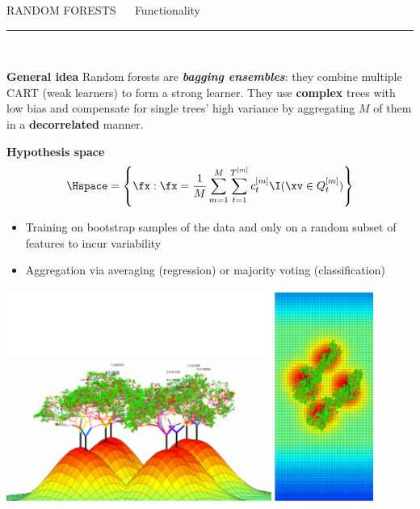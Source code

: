\documentclass[11pt,compress,t,notes=noshow, xcolor=table]{beamer}
\begin{document}
\LARGE
\begin{frame}{\textcolor{gray!80}{RANDOM FORESTS} ~~ Functionality}
\normalsize
\vspace{-0.5cm}
\noindent \textcolor{gray!80}{\rule{\textwidth}{1pt}}

\vspace{0.2cm}

\footnotesize

\colorbox{gray!80}{\textcolor{white}{SUPERVISED}} 
\colorbox{gray!80}{\textcolor{white}{NON-PARAMETRIC}} 
\colorbox{gray!80}{\textcolor{white}{BLACK-BOX}} 
\colorbox{gray!80}{\textcolor{white}{FEATURE SELECTION}}

\medskip

\textbf{\textcolor{gray!80}{General idea}} {}{} Random forests are 
\textit{\textbf{bagging ensembles}}: they combine multiple CART (weak learners)
to form a strong learner. They use \textbf{complex} trees with low  bias and 
compensate for single trees' high variance by aggregating $M$ of them in a 
\textbf{decorrelated} manner. 

\medskip

\textbf{\textcolor{gray!80}{Hypothesis space}}
$$\Hspace = \left\{ \fx: \fx = \frac{1}{M} \sum_{m = 1}^M \sum_{t = 1}^{T^{[m]}} 
c_t^{[m]} \I(\xv \in Q_t^{[m]}) \right\}$$

\medskip

\begin{minipage}{0.5\textwidth}
  \begin{itemize}
    \item Training on bootstrap samples of the data and only on a random subset 
    of features to incur variability
    \item Aggregation via averaging (regression) or majority voting
    (classification)
  \end{itemize}
\end{minipage}%
\begin{minipage}{0.5\textwidth}
  \includegraphics[width=0.9\textwidth]{figure/rf_3d.PNG}
\end{minipage}

\end{frame}
\end{document}
